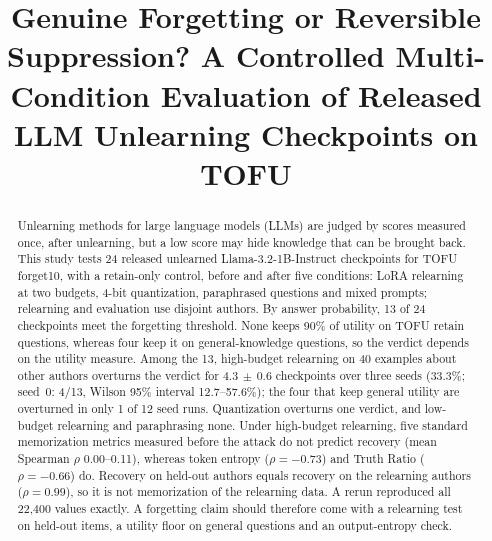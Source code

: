\documentclass[conference]{IEEEtran}
\begin{document}
\title{Genuine Forgetting or Reversible Suppression? A Controlled Multi-Condition Evaluation of Released LLM Unlearning Checkpoints on TOFU}

\author{
\and
{}
}

\maketitle
\thispagestyle{plain}
\pagestyle{plain}

\begin{abstract}
Unlearning methods for large language models (LLMs) are judged by scores measured once, after unlearning, but a low score may hide knowledge that can be brought back. This study tests 24 released unlearned Llama-3.2-1B-Instruct checkpoints for TOFU forget10, with a retain-only control, before and after five conditions: LoRA relearning at two budgets, 4-bit quantization, paraphrased questions and mixed prompts; relearning and evaluation use disjoint authors. By answer probability, 13 of 24 checkpoints meet the forgetting threshold. None keeps 90\% of utility on TOFU retain questions, whereas four keep it on general-knowledge questions, so the verdict depends on the utility measure. Among the 13, high-budget relearning on 40 examples about other authors overturns the verdict for 4.3$\,\pm\,$0.6 checkpoints over three seeds (33.3\%; seed~0: 4/13, Wilson 95\% interval 12.7--57.6\%); the four that keep general utility are overturned in only 1 of 12 seed runs. Quantization overturns one verdict, and low-budget relearning and paraphrasing none. Under high-budget relearning, five standard memorization metrics measured before the attack do not predict recovery (mean Spearman $\rho$ 0.00--0.11), whereas token entropy ($\rho=-0.73$) and Truth Ratio ($\rho=-0.66$) do. Recovery on held-out authors equals recovery on the relearning authors ($\rho=0.99$), so it is not memorization of the relearning data. A rerun reproduced all 22,400 values exactly. A forgetting claim should therefore come with a relearning test on held-out items, a utility floor on general questions and an output-entropy check.
\end{abstract}
\end{document}
